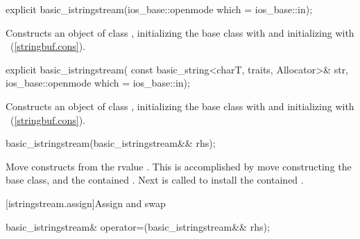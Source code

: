 %
\begin{itemdecl}
explicit basic_istringstream(ios_base::openmode which = ios_base::in);
\end{itemdecl}

\begin{itemdescr}
\pnum
\effects
Constructs an object of class
,
initializing the base class with
and initializing  with
~(\ref{stringbuf.cons}).
\end{itemdescr}

%
\begin{itemdecl}
explicit basic_istringstream(
  const basic_string<charT, traits, Allocator>& str,
  ios_base::openmode which = ios_base::in);
\end{itemdecl}

\begin{itemdescr}
\pnum
\effects
Constructs an object of class
,
initializing the base class with
and initializing  with
~(\ref{stringbuf.cons}).
\end{itemdescr}

%
\begin{itemdecl}
basic_istringstream(basic_istringstream&& rhs);
\end{itemdecl}

\begin{itemdescr}
\pnum
\effects Move constructs from the rvalue . This
is accomplished by move constructing the base class, and the contained
.
Next  is called to
install the contained .
\end{itemdescr}

[istringstream.assign]{Assign and swap}

%
%
\begin{itemdecl}
basic_istringstream& operator=(basic_istringstream&& rhs);
\end{itemdecl}

